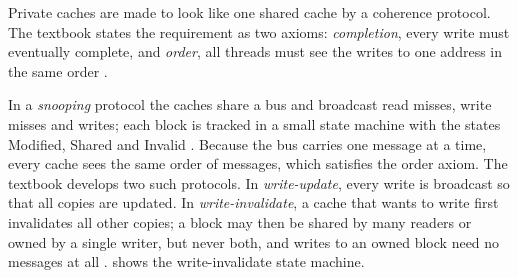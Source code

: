 Private caches are made to look like one shared cache by a coherence protocol. The textbook states the requirement as two axioms: \emph{completion}, every write must eventually complete, and \emph{order}, all threads must see the writes to one address in the same order \cite[sec.~12.4.2]{sarangi2025basic}.

In a \emph{snooping} protocol the caches share a bus and broadcast read misses, write misses and writes; each block is tracked in a small state machine with the states Modified, Shared and Invalid \cite[sec.~12.4.6]{sarangi2025basic}. Because the bus carries one message at a time, every cache sees the same order of messages, which satisfies the order axiom. The textbook develops two such protocols. In \emph{write-update}, every write is broadcast so that all copies are updated. In \emph{write-invalidate}, a cache that wants to write first invalidates all other copies; a block may then be shared by many readers or owned by a single writer, but never both, and writes to an owned block need no messages at all \cite[sec.~12.4.6]{sarangi2025basic}.  shows the write-invalidate state machine.

